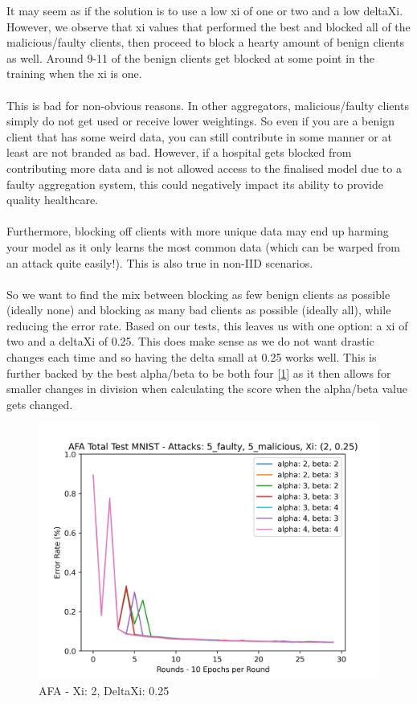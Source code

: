 It may seem as if the solution is to use a low xi of one or two and a low deltaXi. 
However, we observe that xi values that performed the best and blocked all of the malicious/faulty clients, then proceed to block a hearty amount of benign clients as well.
Around 9-11 of the benign clients get blocked at some point in the training when the xi is one.
\\ \\
This is bad for non-obvious reasons. 
In other aggregators, malicious/faulty clients simply do not get used or receive lower weightings. 
So even if you are a benign client that has some weird data, you can still contribute in some manner or at least are not branded as bad. 
However, if a hospital gets blocked from contributing more data and is not allowed access to the finalised model due to a faulty aggregation system, this could negatively impact its ability to provide quality healthcare.
\\ \\
Furthermore, blocking off clients with more unique data may end up harming your model as it only learns the most common data (which can be warped from an attack quite easily!). This is also true in non-IID scenarios.
\\ \\
So we want to find the mix between blocking as few benign clients as possible (ideally none) and blocking as many bad clients as possible (ideally all), while reducing the error rate.
Based on our tests, this leaves us with one option: a xi of two and a deltaXi of 0.25.
This does make sense as we do not want drastic changes each time and so having the delta small at 0.25 works well. 
This is further backed by the best alpha/beta to be both four [\ref{fig:best_afa}] as it then allows for smaller changes in division when calculating the score when the alpha/beta value gets changed.

\begin{figure}[htbp]
	\centering
    \includegraphics[scale=0.7]{initial/graphs/best_afa.png}
	\caption{AFA - Xi: 2, DeltaXi: 0.25}
	\label{fig:best_afa}
\end{figure}


